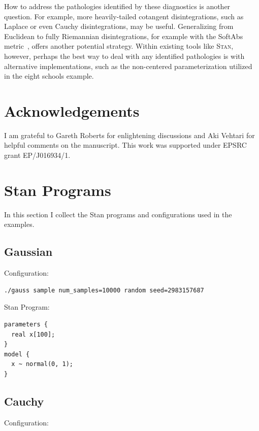 \documentclass[stslayout]{imsart}
\begin{document}
How to address the pathologies identified by these diagnostics
is another question.  For example, more heavily-tailed cotangent
disintegrations, such as Laplace or even Cauchy disintegrations,
may be useful.  Generalizing from Euclidean to fully Riemannian
disintegrations, for example with the SoftAbs metric~\citep{Betancourt:2013b},
offers another potential strategy.  Within existing tools like \textsc{Stan},
however, perhaps the best way to deal with any identified pathologies is
with alternative implementations, such as the non-centered parameterization
utilized in the eight schools example.

\section{Acknowledgements}

I am grateful to Gareth Roberts for enlightening discussions and Aki Vehtari
for helpful comments on the manuscript.  This work was supported under 
EPSRC grant EP/J016934/1.

\setcounter{section}{0}
\renewcommand{\thesection}{\Alph{section}}

\section{Stan Programs}

In this section I collect the Stan programs and configurations used in
the examples.

\subsection{Gaussian}

\noindent Configuration:

{\small
\begin{verbatim}
./gauss sample num_samples=10000 random seed=2983157687
\end{verbatim}
}

\noindent Stan Program:

{\small
\begin{verbatim}
parameters {
  real x[100];
}
model {
  x ~ normal(0, 1);
}
\end{verbatim}
}

\subsection{Cauchy}

\noindent Configuration:
\end{document}
